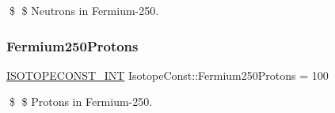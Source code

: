 \$ \$ Neutrons in Fermium-\/250. \mbox{\label{group___isotope_const-_fermium-_fm250_gad33ff087651ede9e9ad1c62421535d74}} 
\subsubsection{\texorpdfstring{Fermium250\+Protons}{Fermium250Protons}}
{\footnotesize\ttfamily \mbox{\hyperlink{group___isotope_const-_macros_ga5f18360b3e99483a35c32d789e62621c}{I\+S\+O\+T\+O\+P\+E\+C\+O\+N\+S\+T\+\_\+\+I\+NT}} Isotope\+Const\+::\+Fermium250\+Protons = 100}

\$ \$ Protons in Fermium-\/250. 